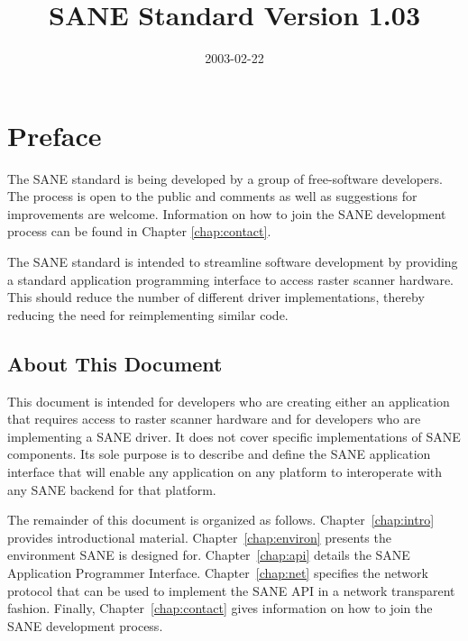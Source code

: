 \documentclass[11pt,DVIps]{report}
\title{\huge SANE Standard Version 1.03}
\author{}
\date{2003-02-22}
\begin{document}
\newcommand{\filename}[1]{{\tt #1}}
\newcommand{\code}[1]{{\tt #1}}
\newcommand{\var}[1]{{\it #1}}
\newcommand{\defn}[1]{#1\index{#1}}

\begin{latexonly}
  \setcounter{changebargrey}{0}   %
\end{latexonly}

\maketitle
\tableofcontents
\listoffigures
\listoftables


\chapter{Preface}

The SANE standard is being developed by a group of free-software
developers.  The process is open to the public and comments as well as
suggestions for improvements are welcome.  Information on how to join
the SANE development process can be found in Chapter
\ref{chap:contact}.

The SANE standard is intended to streamline software development by
providing a standard application programming interface to access
raster scanner hardware.  This should reduce the number of different
driver implementations, thereby reducing the need for reimplementing
similar code.


\section{About This Document}

This document is intended for developers who are creating either an
application that requires access to raster scanner hardware and for
developers who are implementing a SANE driver.  It does not cover
specific implementations of SANE components.  Its sole purpose is to
describe and define the SANE application interface that will enable
any application on any platform to interoperate with any SANE backend
for that platform.

The remainder of this document is organized as follows.
Chapter~\ref{chap:intro} provides introductional material.
Chapter~\ref{chap:environ} presents the environment SANE is designed
for.  Chapter~\ref{chap:api} details the SANE Application Programmer
Interface.  Chapter~\ref{chap:net} specifies the network protocol that
can be used to implement the SANE API in a network transparent
fashion.  Finally, Chapter~\ref{chap:contact} gives information on how
to join the SANE development process.
\end{document}
